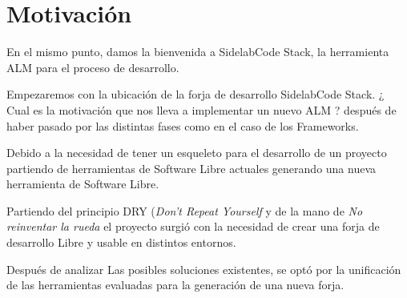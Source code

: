 \documentclass[11pt]{scrartcl}
\begin{document}
\tableofcontents  %

\newpage

\listoffigures  %

\newpage

\listoftables %

\newpage











\section{Motivaci\'on}
\label{sec:motivacion}

\par En el mismo punto, damos la bienvenida a SidelabCode Stack, la herramienta ALM para el proceso de desarrollo. 

\par Empezaremos con la ubicación de la forja de desarrollo SidelabCode Stack. ¿ Cual es la motivación que nos lleva a implementar un nuevo ALM ? después de haber pasado por las distintas fases como en el caso de los Frameworks.

\par Debido a la necesidad de tener un esqueleto para el desarrollo de un proyecto partiendo de herramientas de Software Libre actuales generando una nueva herramienta de Software Libre.

\par Partiendo del principio DRY (\emph{Don't Repeat Yourself} y de la mano de \emph{No reinventar la rueda} el proyecto surgió con la necesidad de crear una forja de desarrollo Libre y usable en distintos entornos.

\par Después de analizar Las posibles soluciones existentes, se optó por la unificación de las herramientas evaluadas para la generación de una nueva forja. 
\end{document}
